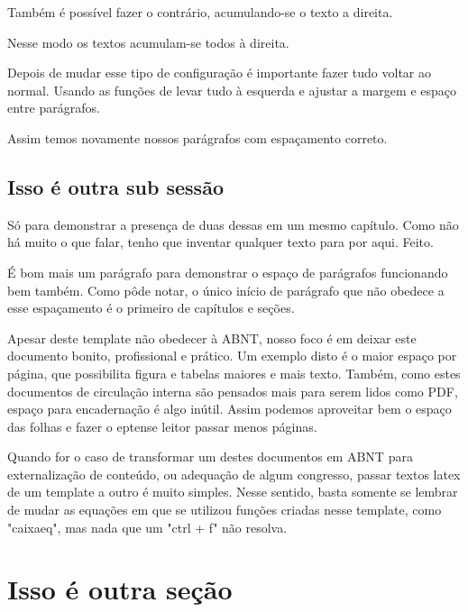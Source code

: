 Também é possível fazer o contrário, acumulando-se o texto a direita.

Nesse modo os textos acumulam-se todos à direita.

\flushleft                                                                %
\setlength\parindent{3ex}                                                 %
\setlength{\parskip}{0.25em}                                              %

Depois de mudar esse tipo de configuração é importante fazer tudo voltar ao normal. Usando as funções de levar tudo à esquerda e ajustar a margem e espaço entre parágrafos.

Assim temos novamente nossos parágrafos com espaçamento correto.

\subsection{Isso é outra sub sessão} 

Só para demonstrar a presença de duas dessas em um mesmo capítulo. Como não há muito o que falar, tenho que inventar qualquer texto para por aqui. Feito.

É bom mais um parágrafo para demonstrar o espaço de parágrafos funcionando bem também. Como pôde notar, o único início de parágrafo que não obedece a esse espaçamento é o primeiro de capítulos e seções. 

Apesar deste template não obedecer à ABNT, nosso foco é em deixar este documento bonito, profissional e prático. Um exemplo disto é o maior espaço por página, que possibilita figura e tabelas maiores e mais texto. Também, como estes documentos de circulação interna são pensados mais para serem lidos como PDF, espaço para encadernação é algo inútil. Assim podemos aproveitar bem o espaço das folhas e fazer o eptense leitor passar menos páginas.

Quando for o caso de transformar um destes documentos em ABNT para externalização de conteúdo, ou adequação de algum congresso, passar textos latex de um template a outro é muito simples. Nesse sentido, basta somente se lembrar de mudar as equações em que se utilizou funções criadas nesse template, como "caixaeq", mas nada que um "ctrl + f" não resolva.  

\section{Isso é outra seção}

